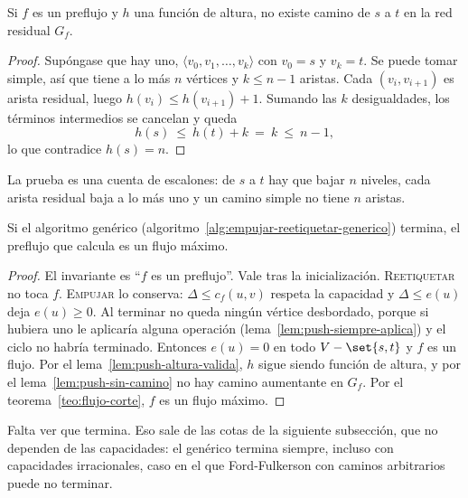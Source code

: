 \documentclass[11pt,letterpaper]{article}
\begin{document}
\begin{lema}
  \label{lem:push-sin-camino}
  Si $f$ es un preflujo y $h$ una función de altura, no existe camino
  de $s$ a $t$ en la red residual $G_f$.
\end{lema}

\begin{proof}
  Supóngase que hay uno, $\langle v_0, v_1, \dots, v_k\rangle$ con
  $v_0 = s$ y $v_k = t$. Se puede tomar simple, así que tiene a lo más
  $n$ vértices y $k \le n - 1$ aristas. Cada $(v_i, v_{i+1})$ es arista
  residual, luego $h(v_i) \le h(v_{i+1}) + 1$. Sumando las $k$
  desigualdades, los términos intermedios se cancelan y queda
  \[
    h(s) \ \le\ h(t) + k \ =\ k \ \le\ n - 1 ,
  \]
  lo que contradice $h(s) = n$.
\end{proof}

La prueba es una cuenta de escalones: de $s$ a $t$ hay que bajar $n$
niveles, cada arista residual baja a lo más uno y un camino simple no
tiene $n$ aristas.

\begin{teorema}
  \label{teo:push-correccion}
  Si el algoritmo genérico (algoritmo~\ref{alg:empujar-reetiquetar-generico})
  termina, el preflujo que calcula es un flujo máximo.
\end{teorema}

\begin{proof}
  El invariante es ``$f$ es un preflujo''. Vale tras la inicialización.
  \textsc{Reetiquetar} no toca $f$. \textsc{Empujar} lo conserva:
  $\Delta \le c_f(u, v)$ respeta la capacidad y $\Delta \le e(u)$ deja
  $e(u) \ge 0$. Al terminar no queda ningún vértice desbordado, porque
  si hubiera uno le aplicaría alguna operación
  (lema~\ref{lem:push-siempre-aplica}) y el ciclo no habría terminado.
  Entonces $e(u) = 0$ en todo $V - \set{s, t}$ y $f$ es un flujo. Por
  el lema~\ref{lem:push-altura-valida}, $h$ sigue siendo función de
  altura, y por el lema~\ref{lem:push-sin-camino} no hay camino
  aumentante en $G_f$. Por el teorema~\ref{teo:flujo-corte}, $f$ es un
  flujo máximo.
\end{proof}

Falta ver que termina. Eso sale de las cotas de la siguiente
subsección, que no dependen de las capacidades: el genérico termina
siempre, incluso con capacidades irracionales, caso en el que
Ford-Fulkerson con caminos arbitrarios puede no terminar.

\end{document}
